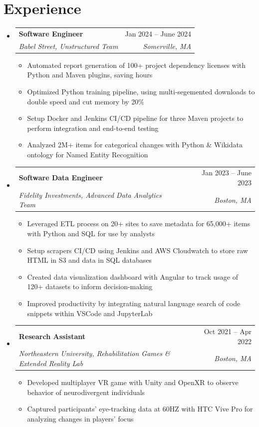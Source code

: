 \documentclass[letterpaper,11pt]{article}
\makeatletter
\newcommand{\resumeItem}[1]{
  \item\small{
    {#1 \vspace{-2pt}}
  }
}
\newcommand{\resumeSubheading}[4]{
  \vspace{-2pt}\item
    \begin{tabular*}{0.97\textwidth}[t]{l@{\extracolsep{\fill}}r}
      \textbf{#1} & #2 \\
      \textit{\small#3} & \textit{\small #4} \\
    \end{tabular*}\vspace{-7pt}
}
\newcommand{\resumeSubSubheading}[2]{
    \item
    \begin{tabular*}{0.97\textwidth}{l@{\extracolsep{\fill}}r}
      \textit{\small#1} & \textit{\small #2} \\
    \end{tabular*}\vspace{-7pt}
}
\newcommand{\resumeSubHeadingListStart}{\begin{itemize}[leftmargin=0.15in, label={}]}
\newcommand{\resumeSubHeadingListEnd}{\end{itemize}}
\newcommand{\resumeItemListStart}{\begin{itemize}}
\newcommand{\resumeItemListEnd}{\end{itemize}\vspace{-5pt}}
\makeatother
\begin{document}
\section{Experience}
\resumeSubHeadingListStart


\resumeSubheading
{Software Engineer}{Jan 2024 -- June 2024}
{Babel Street, Unstructured Team}{Somerville, MA}
\resumeItemListStart
\resumeItem{Automated report generation of 100+ project dependency licenses with Python and Maven plugins, saving hours}
\resumeItem{Optimized Python training pipeline, using multi-segemented downloads to double speed and cut memory by 20\%}
\resumeItem{Setup Docker and Jenkins CI/CD pipeline for three Maven projects to perform integration and end-to-end testing }
\resumeItem{Analyzed 2M+ items for categorical changes with Python \& Wikidata ontology for Named Entity Recognition}
\resumeItemListEnd

\resumeSubheading
{Software Data Engineer}{Jan 2023 -- June 2023}
{Fidelity Investments, Advanced Data Analytics Team}{Boston, MA}
\resumeItemListStart
\resumeItem{Leveraged ETL process on 20+ sites to save metadata for 65,000+ items with Python and SQL for use by analysts}
\resumeItem{Setup scrapers CI/CD using Jenkins and AWS Cloudwatch to store raw HTML in S3 and data in SQL databases}
\resumeItem{Created data visualization dashboard with Angular to track usage of 120+ datasets to inform decision-making}
\resumeItem{Improved productivity by integrating natural language search of code snippets within VSCode and JupyterLab}
\resumeItemListEnd

\resumeSubheading
{Research Assistant}{Oct 2021 -- Apr 2022}
{Northeastern University, Rehabilitation Games \& Extended Reality Lab}{Boston, MA}
\resumeItemListStart
\resumeItem{Developed multiplayer VR game with Unity and OpenXR to observe behavior of neurodivergent individuals}
\resumeItem{Captured participants' eye-tracking data at 60HZ with HTC Vive Pro for analyzing changes in players' focus}
\resumeItemListEnd

\resumeSubHeadingListEnd
\end{document}
